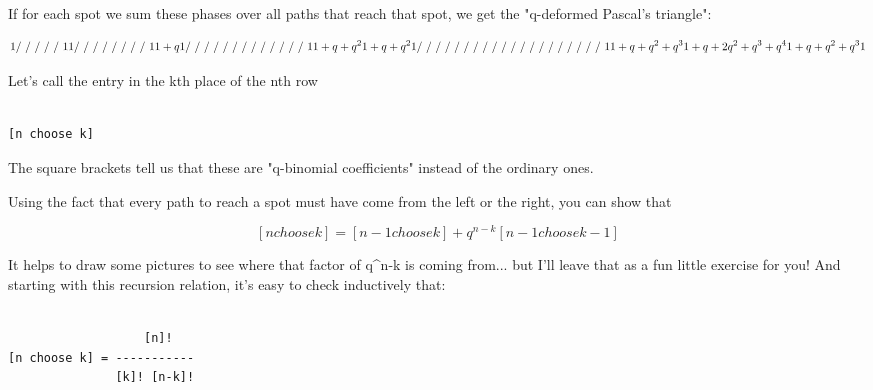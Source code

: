 If for each spot we sum these phases over all paths that reach
that spot, we get the "q-deformed Pascal's triangle":


$$

                               1
                              / \
                             /   \
                            /     \
                           /       \
                          /         \
                         1           1
                        / \         / \
                       /   \       /   \
                      /     \     /     \
                     /       \   /       \                
                    1         1+q         1
                   / \        / \        / \
                  /   \      /   \      /   \
                 /     \    /     \    /     \
                /       \  /       \  /       \
               /         \/         \/         \
              1        1+q+q^{2}      1+q+q^{2 }       1
             / \         /\         /\         / \
            /   \       /  \       /  \       /   \
           /     \     /    \     /    \     /     \
          /       \   /      \   /      \   /       \
         /         \ /        \ /        \ /         \
        1    1+q+q^{2}+q^{3}    1+q+2q^{2}+q^{3}+q^{4}  1+q+q^{2}+q^{3 }     1

$$
    
Let's call the entry in the kth place of the nth row 


\begin{verbatim}

[n choose k]
\end{verbatim}
    
The square brackets tell us that these are "q-binomial coefficients"
instead of the ordinary ones.

Using the fact that every path to reach a spot must have come 
from the left or the right, you can show that


$$

[n choose k]  =  [n-1 choose k]  +  q^{n-k} [n-1 choose k-1]
$$
    
It helps to draw some pictures to see where that factor of q^{n-k} is
coming from... but I'll leave that as a fun little exercise for you!   
And starting with this recursion relation, it's easy to check inductively 
that:


\begin{verbatim}

                   [n]!
[n choose k] = -----------
               [k]! [n-k]!
\end{verbatim}
    
